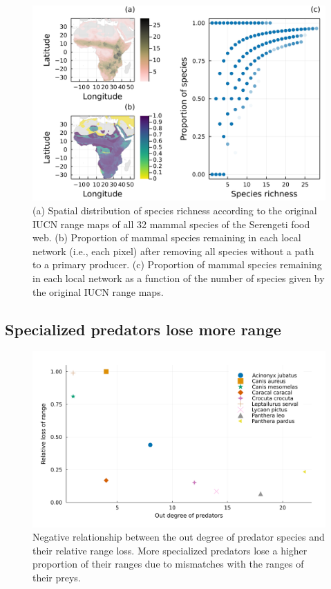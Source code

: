\documentclass[10pt,oneside]{article}
\makeatletter
\def\maxwidth{\ifdim\Gin@nat@width>\linewidth\linewidth
\else\Gin@nat@width\fi}
\let\Oldincludegraphics\includegraphics
\renewcommand{\includegraphics}[1]{\Oldincludegraphics[width=\maxwidth]{#1}}
\makeatother
\begin{document}
\begin{figure}
\hypertarget{fig:richness}{%
\centering
\includegraphics{figures/richness_prop_removed.png}
\caption{(a) Spatial distribution of species richness according to the
original IUCN range maps of all 32 mammal species of the Serengeti food
web. (b) Proportion of mammal species remaining in each local network
(i.e., each pixel) after removing all species without a path to a
primary producer. (c) Proportion of mammal species remaining in each
local network as a function of the number of species given by the
original IUCN range maps.}\label{fig:richness}
}
\end{figure}

\hypertarget{specialized-predators-lose-more-range}{%
\subsection{Specialized predators lose more
range}\label{specialized-predators-lose-more-range}}

\begin{figure}
\hypertarget{fig:degree}{%
\centering
\includegraphics{figures/rel_loss-outdegree-species.png}
\caption{Negative relationship between the out degree of predator
species and their relative range loss. More specialized predators lose a
higher proportion of their ranges due to mismatches with the ranges of
their preys.}\label{fig:degree}
}
\end{figure}
\end{document}
